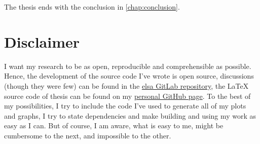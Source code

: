The thesis ends with the conclusion in \autoref{chap:conclusion}.

\section{Disclaimer}\label{sec:disclaimer}

I want my research to be as open, reproducible and comprehensible as possible. Hence, the
development of the source code I've wrote is open source, discussions (though they were few) can be
found in the \href{https://gitlab.lrz.de/IP/elsa}{elsa GitLab repository}, the \LaTeX{} source code
of thesis can be found on my
\href{https://github.com/ner0-m/ma-thesis-differential-basis-for-ct}{personal GitHub page}. To the
best of my possibilities, I try to include the code I've used to generate all of my plots and
graphs, I try to state dependencies and make building and using my work as easy as I can. But of
course, I am aware, what is easy to me, might be cumbersome to the next, and impossible to the
other.

